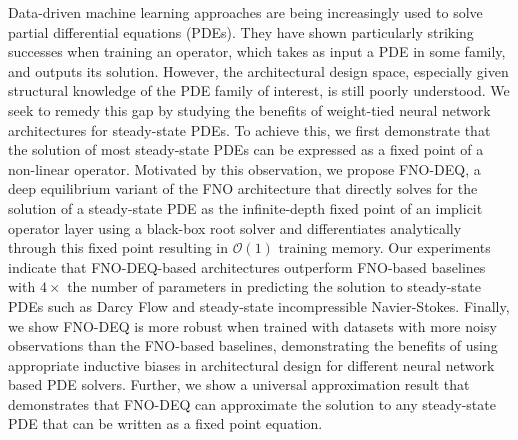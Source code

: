 Data-driven machine learning approaches 
are being increasingly used to solve partial differential equations (PDEs). They have shown particularly striking successes when training an operator, which takes as input a PDE in some family, and outputs its solution.   
However, the architectural design space, especially given structural knowledge of the PDE family of interest, is still poorly understood.    
We seek to remedy this gap by studying the benefits of weight-tied neural network architectures for steady-state PDEs. 
To achieve this, we first demonstrate that the solution of most steady-state PDEs can be expressed as a fixed point of a non-linear operator. 
Motivated by this observation, we propose FNO-DEQ, a deep equilibrium variant of the FNO architecture that directly solves for the solution of a steady-state PDE as the infinite-depth fixed point of an implicit operator layer using a black-box root solver and differentiates analytically through this fixed point resulting in $\mathcal{O}(1)$ training memory.
Our experiments indicate that FNO-DEQ-based architectures outperform 
FNO-based baselines with $4\times$ the number of parameters in predicting the solution to steady-state PDEs such as Darcy Flow and steady-state incompressible Navier-Stokes.
Finally, we show FNO-DEQ 
is more robust 
when trained with datasets with more noisy observations
than the FNO-based baselines, 
demonstrating the benefits of using appropriate inductive biases in architectural design for different 
neural network based PDE solvers.
Further, we 
show a universal approximation result that demonstrates that FNO-DEQ can approximate the solution to any steady-state PDE that can be written as a fixed point equation.